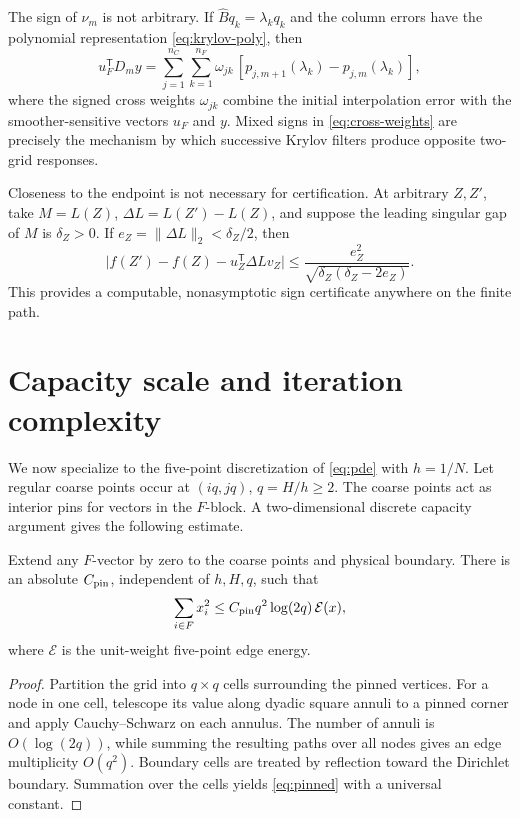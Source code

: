\documentclass[smallextended]{svjour3}
\newcommand{\T}{\mathsf{T}}
\newcommand{\cE}{\mathcal{E}}
\newcommand{\norm}[1]{\lVert#1\rVert}
\newcommand{\abs}[1]{\lvert#1\rvert}
\begin{document}
The sign of $\nu_m$ is not arbitrary. If $\widehat Bq_k=\lambda_kq_k$ and the column errors have the polynomial representation \eqref{eq:krylov-poly}, then
\begin{equation}\label{eq:cross-weights}
 u_F^{\T}D_my=\sum_{j=1}^{n_C}\sum_{k=1}^{n_F}
 \omega_{jk}\,[p_{j,m+1}(\lambda_k)-p_{j,m}(\lambda_k)],
\end{equation}
where the signed cross weights $\omega_{jk}$ combine the initial interpolation error with the smoother-sensitive vectors $u_F$ and $y$. Mixed signs in \eqref{eq:cross-weights} are precisely the mechanism by which successive Krylov filters produce opposite two-grid responses.

Closeness to the endpoint is not necessary for certification. At arbitrary $Z,Z'$, take $M=L(Z)$, $\Delta L=L(Z')-L(Z)$, and suppose the leading singular gap of $M$ is $\delta_Z>0$. If $e_Z=\norm{\Delta L}_2<\delta_Z/2$, then
\begin{equation}\label{eq:pathwise}
 \abs{f(Z')-f(Z)-u_Z^\T\Delta L v_Z}
 \le\frac{e_Z^2}{\sqrt{\delta_Z(\delta_Z-2e_Z)}}.
\end{equation}
This provides a computable, nonasymptotic sign certificate anywhere on the finite path.

\section{Capacity scale and iteration complexity}\label{sec:scaling}
We now specialize to the five-point discretization of \eqref{eq:pde} with $h=1/N$. Let regular coarse points occur at $(iq,jq)$, $q=H/h\ge2$. The coarse points act as interior pins for vectors in the $F$-block. A two-dimensional discrete capacity argument gives the following estimate.

\begin{lemma}\label{lem:pinned}
Extend any $F$-vector by zero to the coarse points and physical boundary. There is an absolute $C_{\rm pin}$, independent of $h,H,q$, such that
\begin{equation}\label{eq:pinned}
 \sum_{i\in F}x_i^2\le C_{\rm pin}q^2\log(2q)\,\cE(x),
\end{equation}
where $\cE$ is the unit-weight five-point edge energy.
\end{lemma}
\begin{proof}
Partition the grid into $q\times q$ cells surrounding the pinned vertices. For a node in one cell, telescope its value along dyadic square annuli to a pinned corner and apply Cauchy--Schwarz on each annulus. The number of annuli is $O(\log(2q))$, while summing the resulting paths over all nodes gives an edge multiplicity $O(q^2)$. Boundary cells are treated by reflection toward the Dirichlet boundary. Summation over the cells yields \eqref{eq:pinned} with a universal constant.
\end{proof}
\end{document}

